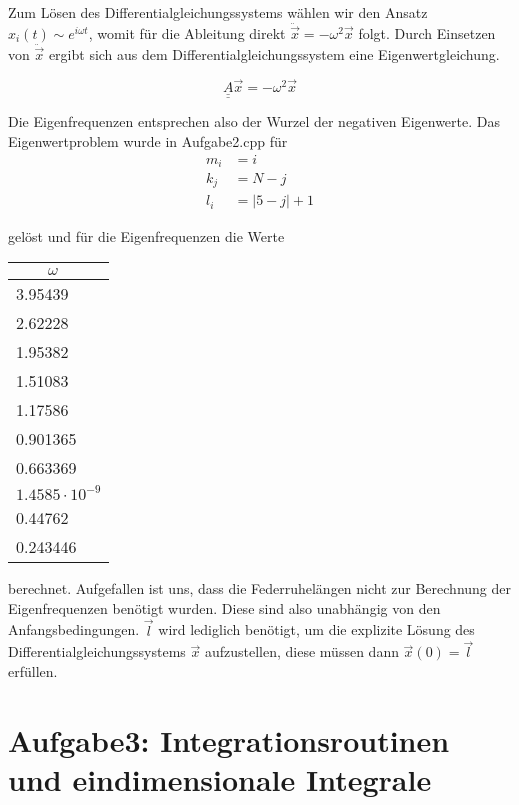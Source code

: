 Zum Lösen des Differentialgleichungssystems wählen wir den Ansatz $x_i(t) \sim e^{i\omega t}$, womit für die Ableitung direkt $\ddot{\vec{x}} = -\omega^2 \vec{x}$ folgt. Durch Einsetzen von $\ddot{\vec{x}}$ ergibt sich aus dem Differentialgleichungssystem eine Eigenwertgleichung.

\begin{equation*}
  \underline{\underline{A}}\vec{x} = -\omega^2\vec{x}
\end{equation*}

\noindent
Die Eigenfrequenzen entsprechen also der Wurzel der negativen Eigenwerte. Das Eigenwertproblem wurde in Aufgabe2.cpp für
\begin{align*}
  m_i &= i \\
  k_j &= N-j \\
  l_i &= |5-j|+1
\end{align*}

\noindent
gelöst und für die Eigenfrequenzen die Werte

\FloatBarrier
\begin{table}[h]
    \centering
    \begin{tabular}{l}
        \textbf{$\qquad \omega$} \\
        \toprule 3.95439 \\ 2.62228 \\ 1.95382 \\ 1.51083 \\ 1.17586 \\ 0.901365 \\ 0.663369 \\ $1.4585\cdot 10^{-9}$ \\ 0.44762 \\ 0.243446 \\
        \bottomrule
    \end{tabular}
\end{table}
\noindent
\FloatBarrier
\noindent
berechnet. Aufgefallen ist uns, dass die Federruhelängen nicht zur Berechnung der Eigenfrequenzen benötigt wurden. Diese sind also unabhängig von den Anfangsbedingungen. $\vec{l}$ wird lediglich benötigt, um die explizite Lösung des Differentialgleichungssystems $\vec{x}$ aufzustellen, diese müssen dann $\vec{x}(0) = \vec{l}$ erfüllen.

\section*{Aufgabe3: Integrationsroutinen und eindimensionale Integrale}


